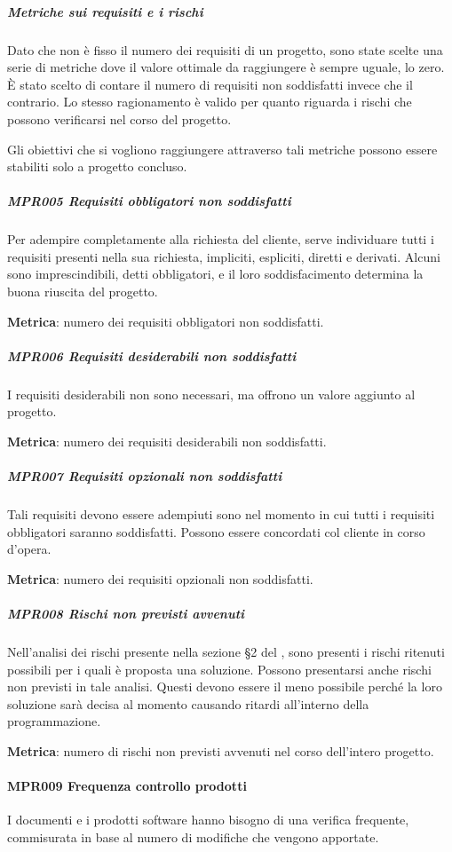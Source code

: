 				\subparagraph*{Metriche sui requisiti e i rischi}
				Dato che non è fisso il numero dei requisiti di un progetto, sono state scelte una serie di metriche dove il valore ottimale da raggiungere è sempre uguale,
				lo zero. È stato scelto di contare il numero di requisiti non soddisfatti invece che il contrario. Lo stesso ragionamento è valido per quanto
				riguarda i rischi che possono verificarsi nel corso del progetto.

				Gli obiettivi che si vogliono raggiungere attraverso tali metriche possono essere stabiliti solo a progetto concluso.

				\subparagraph{MPR005 Requisiti obbligatori non soddisfatti}
				Per adempire completamente alla richiesta del cliente, serve individuare tutti i requisiti presenti nella sua richiesta, impliciti, espliciti, diretti e
				derivati. Alcuni sono imprescindibili, detti obbligatori, e il loro soddisfacimento determina la buona riuscita del progetto.

				\textbf{Metrica}: numero dei requisiti obbligatori non soddisfatti.

				\subparagraph{MPR006 Requisiti desiderabili non soddisfatti}
				I requisiti desiderabili non sono necessari, ma offrono un valore aggiunto al progetto.

				\textbf{Metrica}: numero dei requisiti desiderabili non soddisfatti.

				\subparagraph{MPR007 Requisiti opzionali non soddisfatti}
				Tali requisiti devono essere adempiuti sono nel momento in cui tutti i requisiti obbligatori saranno soddisfatti.
				Possono essere concordati col cliente in corso d'opera.

				\textbf{Metrica}: numero dei requisiti opzionali non soddisfatti.

				\subparagraph{MPR008 Rischi non previsti avvenuti} %
				Nell'analisi dei rischi presente nella sezione §2 del \Doc{\PdPv}, sono presenti i rischi ritenuti possibili per i quali è proposta una soluzione.
				Possono presentarsi anche rischi non previsti in tale analisi. Questi devono essere il meno possibile perché la loro soluzione sarà decisa al momento causando ritardi all'interno della programmazione.

				\textbf{Metrica}: numero di rischi non previsti avvenuti nel corso dell'intero progetto.

				\paragraph{MPR009 Frequenza controllo prodotti}
				I documenti e i prodotti software hanno bisogno di una verifica frequente, commisurata in base al numero di modifiche che vengono apportate.

